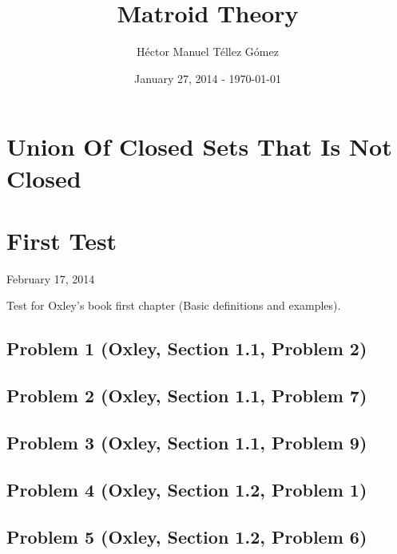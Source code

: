 \frontmatter
\title{Matroid Theory}
\author{Héctor Manuel Téllez Gómez}
\date{January 27, 2014 - \today}
\maketitle

\tableofcontents

\mainmatter


\chapter{Union Of Closed Sets That Is Not Closed}


\chapter{First Test}
    \begin{center} February 17, 2014 \end{center}
    Test for Oxley's book first chapter (Basic definitions and examples). 
    
    \section{Problem 1 (Oxley, Section 1.1, Problem 2)}
        
        \clearpage

    \section{Problem 2 (Oxley, Section 1.1, Problem 7)}
        
        \clearpage
    \section{Problem 3 (Oxley, Section 1.1, Problem 9)}
        
        \clearpage

    \section{Problem 4 (Oxley, Section 1.2, Problem 1)}
        
        \clearpage

    \section{Problem 5 (Oxley, Section 1.2, Problem 6)}
        
        \clearpage

